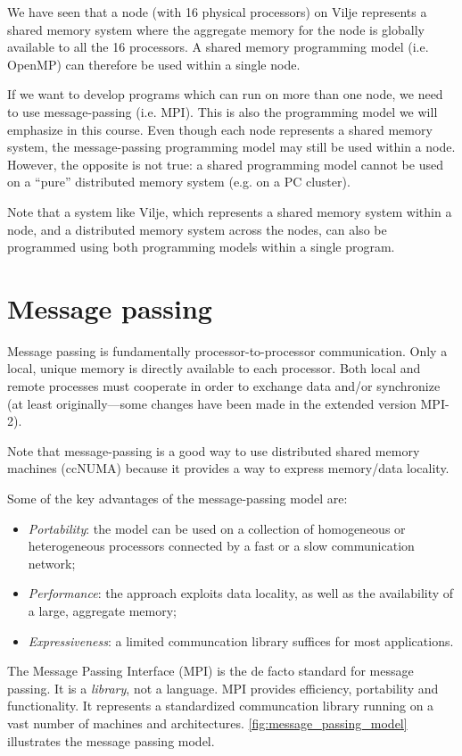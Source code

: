 We have seen that a node (with 16 physical processors) on Vilje represents a
shared memory system where the aggregate memory for the node is globally
available to all the 16 processors. A shared memory programming model (i.e.
OpenMP) can therefore be used within a single node.

If we want to develop programs which can run on more than one node, we need to
use message-passing (i.e. MPI). This is also the programming model we will
emphasize in this course. Even though each node represents a shared memory
system, the message-passing programming model may still be used within a node.
However, the opposite is not true: a shared programming model cannot be used on
a ``pure'' distributed memory system (e.g. on a PC cluster).

Note that a system like Vilje, which represents a shared memory system within a
node, and a distributed memory system across the nodes, can also be programmed
using both programming models within a single program.

\section{Message passing}

Message passing is fundamentally processor-to-processor communication. Only a
local, unique memory is directly available to each processor. Both local and
remote processes must cooperate in order to exchange data and/or synchronize (at
least originally---some changes have been made in the extended version MPI-2).

Note that message-passing is a good way to use distributed shared memory
machines (ccNUMA) because it provides a way to express memory/data locality.

Some of the key advantages of the message-passing model are:
\begin{itemize}
\item {\em Portability}: the model can be used on a collection of
homogeneous or heterogeneous processors connected by a fast or a slow
communication network;
\item {\em Performance}: the approach exploits data locality, as well as the
availability of a large, aggregate memory;
\item {\em Expressiveness}: a limited communcation library suffices for most applications.
\end{itemize}

The Message Passing Interface (MPI) is the de facto standard for message
passing. It is a \emph{library}, not a language. MPI provides efficiency,
portability and functionality. It represents a standardized communcation library
running on a vast number of machines and architectures.
\autoref{fig:message_passing_model} illustrates the message passing model.

